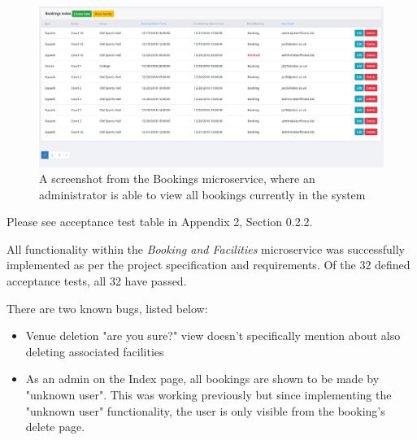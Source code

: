 \begin{figure}[H]
    \centering
    \includegraphics[width=\textwidth]{Images/service_bookings.png}
    \caption{A screenshot from the Bookings microservice, where an administrator is able to view all bookings currently in the system}
\end{figure}

Please see acceptance test table in Appendix 2, Section 0.2.2.

All functionality within the \textit{Booking and Facilities} microservice was successfully implemented as per the project specification and requirements. Of the 32 defined acceptance tests, all 32 have passed.

There are two known bugs, listed below:

\begin{itemize}
	\item Venue deletion "are you sure?" view doesn't specifically mention about also deleting associated facilities

	\item As an admin on the Index page, all bookings are shown to be made by "unknown user". This was working previously but since implementing the "unknown user" functionality, the user is only visible from the booking's delete page.
\end{itemize}